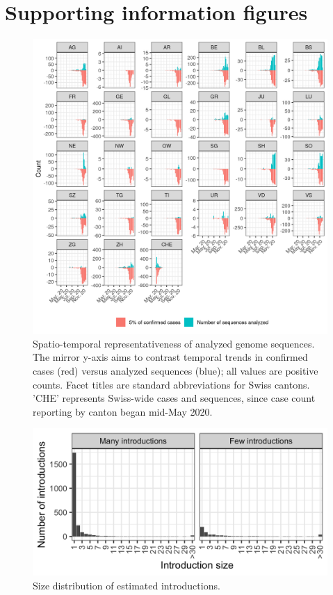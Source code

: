 \documentclass[9pt,twoside,lineno]{pnas-new}
\begin{document}
\newpage

\section{Supporting information figures}

\begin{figure}[h!]
\centering
\includegraphics[width = 0.8\linewidth]{figures/CHE_downsampling.png}
\caption{Spatio-temporal representativeness of analyzed genome sequences. The mirror y-axis aims to contrast temporal trends in confirmed cases (red) versus analyzed sequences (blue); all values are positive counts. Facet titles are standard abbreviations for Swiss cantons. 'CHE' represents Swiss-wide cases and sequences, since case count reporting by canton began mid-May 2020.}  
\label{fig:downsampling_representativeness}
\end{figure}

\begin{figure}[h!]
\centering
\includegraphics[width = 0.5\linewidth]{figures/chain_size_dist.png}
\caption{Size distribution of estimated introductions.}  
\label{fig:chain_size_dist}
\end{figure}
\end{document}
